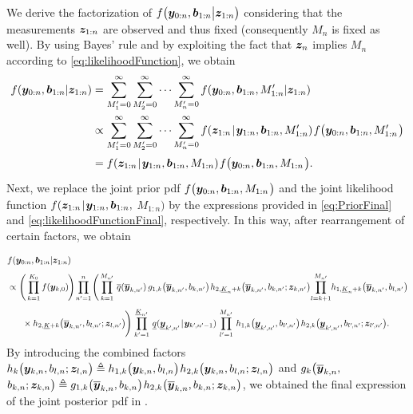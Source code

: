 \documentclass[11pt,a4paper]{article}
\newcommand{\ist}{\hspace*{.3mm}}
\newcommand{\rmv}{\hspace*{-.3mm}}
\newcommand{\nn}{\nonumber}
\begin{document}
We derive the factorization of $f \big( \bm{y}_{0:n},\bm{b}_{1:n} \big |\bm{z}_{1:n} \big)$ considering that the measurements $\bm{z}_{1:n}$ are observed and thus fixed (consequently $M_n$ is fixed as well). By using Bayes' rule and by exploiting the fact that $\bm{z}_n$ implies $M_n$ according to \eqref{eq:likelihoodFunction}, we obtain
\begin{align}
f( \V{y}_{0:n}, \V{b}_{1:n}|\V{z}_{1:n})  &=\sum^{\infty}_{M_1' = 0} \sum^{\infty}_{M_2' = 0} \cdots \sum^{\infty}_{M_n' = 0} f( \V{y}_{0:n}, \V{b}_{1:n}, M'_{1:n}|\V{z}_{1:n})  \nn\\
&\propto \sum^{\infty}_{M_1' = 0} \sum^{\infty}_{M_2' = 0} \cdots \sum^{\infty}_{M_n' = 0} f(\V{z}_{1:n} \ist | \ist \V{y}_{1:n}, \V{b}_{1:n}, M'_{1:n}) \ist f \big (\V{y}_{0:n}, \V{b}_{1:n}, M'_{1:n} \ist \big) \nn\\[.5mm]
&=  f(\V{z}_{1:n} \ist | \ist \V{y}_{1:n}, \V{b}_{1:n}, M_{1:n}) \ist f \big (\V{y}_{0:n}, \V{b}_{1:n}, M_{1:n} \ist \big). \nn\\[-6mm]
\nn
\end{align}

Next, we replace the joint prior \ac{pdf} $f \big (\V{y}_{0:n}, \V{b}_{1:n}, M_{1:n} \ist \big)$ and the joint likelihood function $ f(\V{z}_{1:n} \ist | \ist \V{y}_{1:n}, \V{b}_{1:n},$ $M_{1:n})$ by the expressions provided in \eqref{eq:PriorFinal} and \eqref{eq:likelihoodFunctionFinal}, respectively. In this way, after rearrangement of certain factors, we \vspace{-6mm} obtain

\begin{align}
&f( \V{y}_{0:n}, \V{b}_{1:n}|\V{z}_{1:n})  \nn\\[1.3mm]
&\hspace{0mm}\propto  \Bigg( \prod^{K_0}_{k = 1} f(\V{y}_{k,0}) \rmv \Bigg) \rmv \prod^{n}_{n' = 1} \rmv \Bigg( \prod^{M_{n'}}_{k = 1} \ist \ist  \overline{q}(\overline{\V{y}}_{k,n'}) \ist\ist g_{1,k}\big( \overline{\V{y}}_{k,n'}, b_{k,n'} \big)  \ist    h_{2,\underline{K}_n+k}\big( \overline{\V{y}}_{k,n'}, b_{k,n'}; \V{z}_{k,n'} \big) \rmv\rmv \prod^{M_{n'}}_{l=k+1} \rmv\rmv h_{1,\underline{K}_n+k}\big( \overline{\V{y}}_{k,n'}, b_{l,n'} \big) \nn\\[1.3mm]
&\hspace{6mm}\times  h_{2,\underline{K}+k}\big( \overline{\V{y}}_{k,n'}, b_{l,n'}; \V{z}_{l,n'} \big)\rmv\Bigg) \ist \prod^{\underline{K}_{n'}}_{k' = 1} \ist\ist \underline{q}(\underline{\V{y}}_{k'\rmv,n'} \ist | \ist \V{y}_{k'\rmv,n'-1} ) \ist\ist \prod^{M_{n'}}_{l'=1} \ist\ist h_{1,k}\big( \underline{\V{y}}_{k'\rmv,n'}, b_{l'\rmv,n'} \big)  \ist   h_{2,k}\big( \underline{\V{y}}_{k'\rmv,n'}, b_{l'\rmv,n'}; \V{z}_{l'\rmv,n'} \big).
\nn
\end{align}
By introducing the combined factors $h_k\big( \V{y}_{k,n}, b_{l,n}; \V{z}_{l,n} \big) \triangleq h_{1,k}\big( \V{y}_{k,n}, b_{l,n} \big) \ist h_{2,k}\big( \V{y}_{k,n}, b_{l,n}; \V{z}_{l,n} \big)$ and  $g_k\big( \overline{\bm{y}}_{k,n},$ $b_{k,n}; \V{z}_{k,n} \big) \triangleq g_{1,k}\big( \overline{\V{y}}_{k,n}, b_{k,n} \big) \ist h_{2,k}\big( \overline{\V{y}}_{k,n}, b_{k,n}; \V{z}_{k,n} \big)$, we obtained the final expression of the joint posterior \ac{pdf} in \cite[Eq.~(11)]{MeyWil:J21}.
\end{document}

